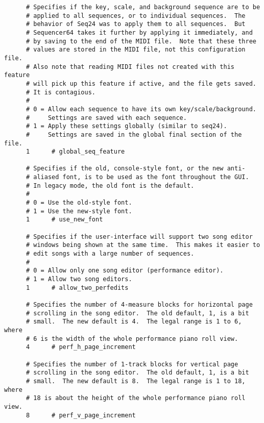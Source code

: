    \begin{verbatim}
      # Specifies if the key, scale, and background sequence are to be
      # applied to all sequences, or to individual sequences.  The
      # behavior of Seq24 was to apply them to all sequences.  But
      # Sequencer64 takes it further by applying it immediately, and
      # by saving to the end of the MIDI file.  Note that these three
      # values are stored in the MIDI file, not this configuration file.
      # Also note that reading MIDI files not created with this feature
      # will pick up this feature if active, and the file gets saved.
      # It is contagious.
      #
      # 0 = Allow each sequence to have its own key/scale/background.
      #     Settings are saved with each sequence.
      # 1 = Apply these settings globally (similar to seq24).
      #     Settings are saved in the global final section of the file.
      1      # global_seq_feature

      # Specifies if the old, console-style font, or the new anti-
      # aliased font, is to be used as the font throughout the GUI.
      # In legacy mode, the old font is the default.
      #
      # 0 = Use the old-style font.
      # 1 = Use the new-style font.
      1      # use_new_font

      # Specifies if the user-interface will support two song editor
      # windows being shown at the same time.  This makes it easier to
      # edit songs with a large number of sequences.
      #
      # 0 = Allow only one song editor (performance editor).
      # 1 = Allow two song editors.
      1      # allow_two_perfedits

      # Specifies the number of 4-measure blocks for horizontal page
      # scrolling in the song editor.  The old default, 1, is a bit
      # small.  The new default is 4.  The legal range is 1 to 6, where
      # 6 is the width of the whole performance piano roll view.
      4      # perf_h_page_increment

      # Specifies the number of 1-track blocks for vertical page
      # scrolling in the song editor.  The old default, 1, is a bit
      # small.  The new default is 8.  The legal range is 1 to 18, where
      # 18 is about the height of the whole performance piano roll view.
      8      # perf_v_page_increment
   \end{verbatim}

